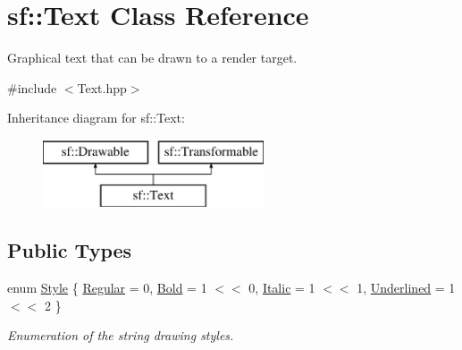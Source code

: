 \hypertarget{classsf_1_1Text}{\section{sf\-:\-:Text Class Reference}
\label{classsf_1_1Text}
}


Graphical text that can be drawn to a render target.  




{\ttfamily \#include $<$Text.\-hpp$>$}

Inheritance diagram for sf\-:\-:Text\-:\begin{figure}[H]
\begin{center}
\leavevmode
\includegraphics[height=2.000000cm]{classsf_1_1Text}
\end{center}
\end{figure}
\subsection*{Public Types}
\begin{DoxyCompactItemize}
\item 
enum \hyperlink{classsf_1_1Text_aa8add4aef484c6e6b20faff07452bd82}{Style} \{ \hyperlink{classsf_1_1Text_aa8add4aef484c6e6b20faff07452bd82a2af9ae5e1cda126570f744448e0caa32}{Regular} = 0, 
\hyperlink{classsf_1_1Text_aa8add4aef484c6e6b20faff07452bd82af1b47f98fb1e10509ba930a596987171}{Bold} = 1 $<$$<$ 0, 
\hyperlink{classsf_1_1Text_aa8add4aef484c6e6b20faff07452bd82aee249eb803848723c542c2062ebe69d8}{Italic} = 1 $<$$<$ 1, 
\hyperlink{classsf_1_1Text_aa8add4aef484c6e6b20faff07452bd82a664bd143f92b6e8c709d7f788e8b20df}{Underlined} = 1 $<$$<$ 2
 \}
\begin{DoxyCompactList}\small\item\em Enumeration of the string drawing styles. \end{DoxyCompactList}\end{DoxyCompactItemize}
